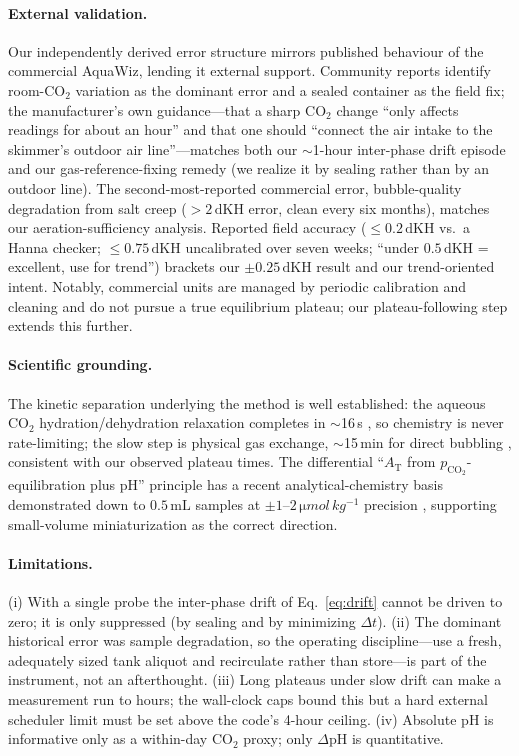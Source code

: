 \documentclass[11pt]{article}
\newcommand{\dpH}{\ensuremath{\Delta\mathrm{pH}}}
\newcommand{\dkh}{\ensuremath{\,\mathrm{dKH}}}
\newcommand{\co}{\ensuremath{\mathrm{CO_2}}}
\newcommand{\pco}{\ensuremath{p_{\mathrm{CO_2}}}}
\newcommand{\at}{\ensuremath{A_\mathrm{T}}}
\begin{document}
\paragraph{External validation.} Our independently derived error structure
mirrors published behaviour of the commercial AquaWiz, lending it external
support. Community reports identify room-\co{} variation as the dominant error
and a sealed container as the field fix; the manufacturer's own guidance---that
a sharp \co{} change ``only affects readings for about an hour'' and that one
should ``connect the air intake to the skimmer's outdoor air line''---matches
both our $\sim$1-hour inter-phase drift episode and our gas-reference-fixing
remedy (we realize it by sealing rather than by an outdoor line). The
second-most-reported commercial error, bubble-quality degradation from salt
creep ($>2\dkh$ error, clean every six months), matches our aeration-sufficiency
analysis. Reported field accuracy ($\le0.2\dkh$ vs.\ a Hanna checker;
$\le0.75\dkh$ uncalibrated over seven weeks; ``under $0.5\dkh$ = excellent, use
for trend'') brackets our $\pm0.25\dkh$ result and our trend-oriented intent.
Notably, commercial units are managed by periodic calibration and cleaning and do not pursue a
true equilibrium plateau; our plateau-following step extends this further.

\paragraph{Scientific grounding.} The kinetic separation underlying the method
is well established: the aqueous \co{} hydration/dehydration relaxation completes
in $\sim$16\,s \cite{johnson1982}, so chemistry is never rate-limiting;
the slow step is physical gas exchange, $\sim$15\,min for direct
bubbling \cite{takahashi}, consistent with our observed plateau times. The
differential ``$\at{}$ from \pco{}-equilibration plus pH'' principle has a recent
analytical-chemistry basis demonstrated down to $0.5\,\mathrm{mL}$ samples at
$\pm1$--$2\,\si{\micro mol\,kg^{-1}}$ precision \cite{fleger2025}, supporting
small-volume miniaturization as the correct direction.

\paragraph{Limitations.} (i) With a single probe the inter-phase drift of
Eq.~\eqref{eq:drift} cannot be driven to zero; it is only suppressed (by sealing
and by minimizing $\Delta t$). (ii) The dominant historical error was sample
degradation, so the operating discipline---use a fresh, adequately sized tank
aliquot and recirculate rather than store---is part of the instrument, not an
afterthought. (iii) Long plateaus under slow drift can make a measurement run to
hours; the wall-clock caps bound this but a hard external scheduler limit must be
set above the code's 4-hour ceiling. (iv) Absolute pH is informative only as a
within-day \co{} proxy; only \dpH{} is quantitative.
\end{document}
